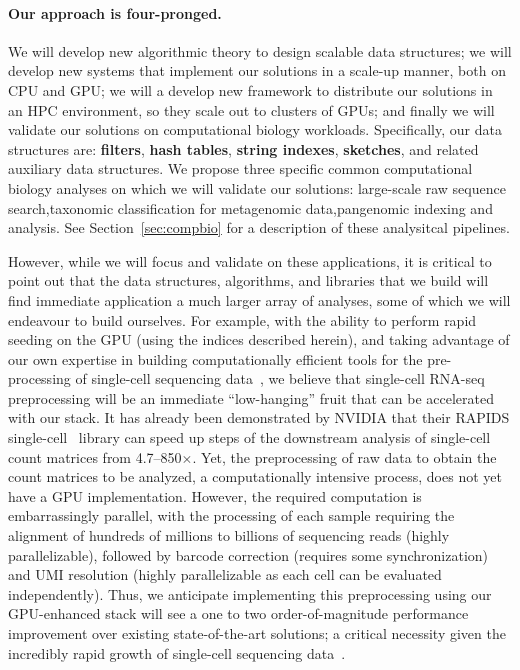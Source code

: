 \paragraph{Our approach is four-pronged.}  We will develop new {algorithmic
theory} to design scalable data structures; we will develop new {systems} that
implement our solutions in a scale-up manner,  both on CPU and GPU\@; we will a
develop new framework to distribute our solutions in an {HPC} environment, so
they scale out to clusters of GPUs; and finally we will validate our solutions
on {computational biology} workloads.
%
Specifically, our data structures are: \textbf{filters}, \textbf{hash tables},
\textbf{string indexes}, \textbf{sketches}, and related auxiliary data
structures.  We propose three specific common computational biology analyses on
which we will validate our solutions: {large-scale raw sequence
search},{taxonomic classification for metagenomic data},{pangenomic indexing
and analysis}.   See Section~\ref{sec:compbio} for a description of these
analysitcal pipelines.

However, while we will focus and validate on these applications, it is critical
to point out that the data structures, algorithms, and libraries that we build
will find immediate application a much larger array of analyses, some of which
we will endeavour to build ourselves. For example, with the ability to perform
rapid seeding on the GPU (using the indices described herein), and taking
advantage of our own expertise in building computationally efficient tools for
the pre-processing of single-cell sequencing data~\cite{he2022alevin}, we
believe that single-cell RNA-seq preprocessing will be an immediate
``low-hanging'' fruit that can be accelerated with our stack. It has already
been demonstrated by NVIDIA that their RAPIDS single-cell~\cite{rapids} library
can speed up steps of the downstream analysis of single-cell count matrices
from 4.7--850$\times$. Yet, the preprocessing of raw data to obtain the count
matrices to be analyzed, a computationally intensive process, does not yet have
a GPU implementation. However, the required computation is embarrassingly
parallel, with the processing of each sample requiring the alignment of
hundreds of millions to billions of sequencing reads (highly parallelizable),
followed by barcode correction (requires some synchronization) and UMI
resolution (highly parallelizable as each cell can be evaluated independently).
Thus, we anticipate implementing this preprocessing using our GPU-enhanced
stack will see a one to two order-of-magnitude performance improvement over
existing state-of-the-art solutions; a critical necessity given the incredibly
rapid growth of single-cell sequencing data~\cite{scgrowth2022}.

